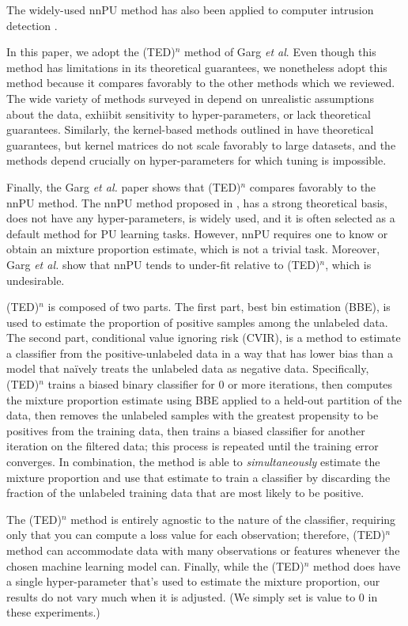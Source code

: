 \documentclass[conference]{IEEEtran}
\begin{document}
    The widely-used nnPU method has also been applied to computer intrusion detection \cite{lv-2020}. 

    In this paper, we adopt the (TED)${}^n$ method of Garg \textit{et al}. Even though this method has limitations in its theoretical guarantees, we nonetheless adopt this method because it compares favorably to the other methods which we reviewed. The wide variety of methods surveyed in \cite{bekker-davis-2020} depend on unrealistic assumptions about the data, exhiibit sensitivity to hyper-parameters, or lack theoretical guarantees. Similarly, the kernel-based methods outlined in \cite{mlws} have theoretical guarantees, but kernel matrices do not scale favorably to large datasets, and the methods depend crucially on hyper-parameters for which tuning is impossible.

    Finally, the Garg \textit{et al.} paper shows that (TED)${}^n$ compares favorably to the nnPU method. The nnPU method proposed in \cite{kiryo-2017}, has a strong theoretical basis, does not have any hyper-parameters, is widely used, and it is often selected as a default method for PU learning tasks. However, nnPU requires one to know or obtain an mixture proportion estimate, which is not a trivial task. Moreover, Garg \textit{et al.} show that nnPU tends to under-fit relative to (TED)${}^n$, which is undesirable.

    (TED)${}^n$ is composed of two parts. The first part, best bin estimation (BBE), is used to estimate the proportion of positive samples among the unlabeled data. The second part, conditional value ignoring risk (CVIR), is a method to estimate a classifier from the positive-unlabeled data in a way that has lower bias than a model that na{\"i}vely treats the unlabeled data as negative data. Specifically, (TED)${}^n$ trains a biased binary classifier for 0 or more iterations, then computes the mixture proportion estimate using BBE applied to a held-out partition of the data, then removes the unlabeled samples with the greatest propensity to be positives from the training data, then trains a biased classifier for another iteration on the filtered data; this process is repeated until the training error converges. In combination, the method is able to \textit{simultaneously} estimate the mixture proportion and use that estimate to train a classifier by discarding the fraction of the unlabeled training data that are most likely to be positive. 

    The (TED)${}^n$ method is entirely agnostic to the nature of the classifier, requiring only that you can compute a loss value for each observation; therefore, (TED)${}^n$ method can accommodate data with many observations or features whenever the chosen machine learning model can. Finally, while the (TED)${}^n$ method does have a single hyper-parameter that's used to estimate the mixture proportion, our results do not vary much when it is adjusted. (We simply set is value to 0 in these experiments.)
\end{document}
